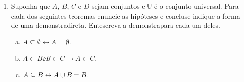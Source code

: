 \begin{enumerate}[{\bf 1.}]
\begin{enumerate}[a)]
{\bf{\it Resposta:} Seja ${\bf x\in (A\inter B)^C}$, assim ${\bf x\notin A\inter B}$ ou seja, ${\bf x\notin A}$ ou ${\bf x\notin B}$, portanto ${\bf x\in A^C}$ ou ${\bf x\in B^C}$. Logo, ${\bf x\in A^C\uni B^C}$. Por outro lado, seja ${\bf x\in A^C\uni B^C}$, assim ${\bf x\notin A}$ e ${\bf x\notin B}$, portanto ${\bf x\notin A\inter B}$ que implica que ${\bf x\in (A\inter B)^C}$.}

\item $A\uni(B-A)=A\uni B$.

{\bf{\it Resposta:} Seja ${\bf x\in A\uni(B-A)}$. Se ${\bf x\in A}$, o teorema estar\'a demonstrado, logo suponha que ${\bf x\in B-A}$. Ent\ao ${\bf x\in B}$ e ${\bf x\notin A}$. Assim, ${\bf x\in A\uni B}$ e portanto, ${\bf A\uni(B-A)\subseteq A\uni B}$. Agora, suponha que ${\bf x\in A\uni B}$. Ent\ao ${\bf x\in A}$ ou ${\bf x\in B}$. Se ${\bf x\in A}$, o resultado est\'a provado, portanto suponha que ${\bf x\notin A}$. Ent\ao ${\bf x\in B}$ e consequentemente temos ${\bf x\in B-A}$ e assim completamos a demonstra\caoi.}
\item $(A\uni B)-(A\inter B)=(A-B)\uni(B-A)$.

\item $A-(B\uni C)=(A-B)\inter(A-C)$.

{\bf{\it Resposta:} Seja ${\bf x\in A-(B\uni C)}$. Assim, ${\bf x\in A}$ e ${\bf x\notin B\uni C}$. Portanto, ${\bf x\in A}$ e ${\bf x\notin B}$ e ${\bf x\notin C}$. Logo, ${\bf x\in A-B}$ e ${\bf x\in A-C}$. Portanto, ${\bf x\in (A-B)\inter(A-C)}$. Agora, seja ${\bf x\in (A-B)\inter(A-C)}$, ent\ao ${\bf x\in A-B}$ e ${\bf x\in A-C}$. Logo, ${\bf x\in A}$ e ${\bf x\notin B}$ e, ${\bf x\in A}$ e ${\bf x\notin C}$. Portanto, ${\bf x\in A}$ e ${\bf x\notin B\uni C}$ e assim $x\in A\inter(B\uni C)$.}

\item $A\uni(B\inter C)=(A\uni B)\inter(A\uni C)$.
\item $A\inter(B\uni C)=(A\inter B)\uni(A\inter C)$.
\end{enumerate}

\item \label{conjuntos6} Suponha que $A$, $B$, $C$ e $D$ sejam conjuntos e $\mathbb{U}$ \'e o conjunto universal. Para cada dos seguintes teoremas enuncie as hip\'oteses e conclus\aoi e indique a forma de uma demonstra\cao direta. Ent\ao escreva a demonstra\cao para cada um deles.
\begin{enumerate}[a)]
\item $A\subseteq\emptyset\leftrightarrow A=\emptyset$.
\item $A\subset B\ee B\subset C\to A\subset C$.
\item $A\subseteq B\leftrightarrow A\cup B=B$. 


\end{enumerate}
\end{enumerate}
